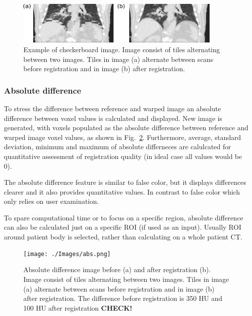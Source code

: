 \documentclass[type=dr, dr=rernat, accentcolor=tud7b,colorbacktitle, bigchapter, openright, twoside, 12pt ]{tudthesis}
\begin{document}
\begin{figure}[H]
	\begin{center}
		\includegraphics[width=0.9\textwidth]{./Images/checkerboard.png}
		\caption{Example of checkerboard image. Image consist of tiles alternating between two images. Tiles in image (a) alternate between scans before registration and in image (b) after registration.}
		\label{checkerboard}
	\end{center}
\end{figure}

\subsubsection{Absolute difference} 

To stress the difference between reference and warped image an absolute difference between voxel values is calculated and displayed. New image is generated, with voxels populated as the absolute difference between reference and warped image voxel values, as shown in Fig.~\ref{absDiff}. Furthermore, average, standard deviation, minimum and maximum of absolute differneces are calulcated for quantitative assessment of registration quality (in ideal case all values would be 0).

The absolute difference feature is similar to false color, but it displays differences clearer and it also provides quantitative values. In contrast to false color which only relies on user examination.

To spare computational time or to focus on a specific region, absolute difference can also be calculated just on a specific ROI (if used as an input). Usually ROI around patient body is selected, rather than calculating on a whole patient CT.

\begin{figure}[H]
	\begin{center}
		\texttt{[image: ./Images/abs.png]}
		\caption{Absolute difference image before (a) and after registration (b).  Image consist of tiles alternating between two images. Tiles in image (a) alternate between scans before registration and in image (b) after registration. The difference before registration is 350 HU and 100 HU after registration \textbf{CHECK!}}
		\label{absDiff}
	\end{center}
\end{figure}
\end{document}
